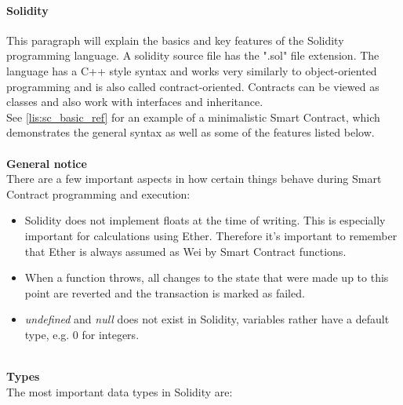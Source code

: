 \paragraph{Solidity}
This paragraph will explain the basics and key features of the Solidity programming language.
A solidity source file has the ".sol" file extension. The language has a C++ style syntax and works very similarly to object-oriented programming and is also called contract-oriented\cite{doc-oriented}. Contracts can be viewed as classes and also work with interfaces and inheritance.
\\
See \ref{lis:sc_basic_ref} for an example of a minimalistic Smart Contract, which demonstrates the general syntax as well as some of the features listed below.
\\\\
\textbf{General notice}\\
There are a few important aspects in how certain things behave during Smart Contract programming and execution:
\begin{itemize}
  \item Solidity does not implement floats at the time of writing. This is especially important for calculations using Ether. Therefore it's important to remember that Ether is always assumed as Wei by Smart Contract functions.
  \item When a function throws, all changes to the state that were made up to this point are reverted and the transaction is marked as failed.
  \item \textit{undefined} and \textit{null} does not exist in Solidity, variables rather have a default type, e.g. 0 for integers\cite{doc-types}.
\end{itemize}
\leavevmode
\\
\textbf{Types}\\
The most important data types in Solidity are\cite{doc-types}:
